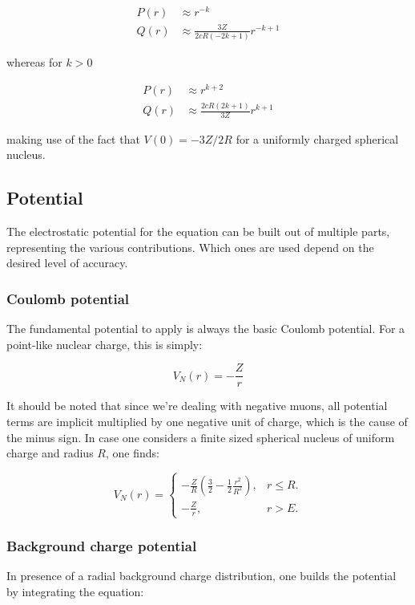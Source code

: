 \documentclass[]{report}
\begin{document}
\begin{align}
P(r) &\approx r^{-k} \\
Q(r) &\approx \frac{3Z}{2cR(-2k+1)}r^{-k+1}
\end{align}

whereas for $k > 0$

\begin{align}
P(r) &\approx r^{k+2} \\
Q(r) &\approx \frac{2cR(2k+1)}{3Z}r^{k+1}
\end{align}

making use of the fact that $V(0) = -3Z/2R$ for a uniformly charged spherical nucleus.

\subsection{Potential}\label{num_pot}

The electrostatic potential for the equation can be built out of multiple parts, representing the various contributions. Which ones are used depend on the desired level of accuracy.

\subsubsection{Coulomb potential}

The fundamental potential to apply is always the basic Coulomb potential. For a point-like nuclear charge, this is simply:

\begin{equation}
	V_N(r) = -\frac{Z}{r}
\end{equation}

It should be noted that since we're dealing with negative muons, all potential terms are implicit multiplied by one negative unit of charge, which is the cause of the minus sign. In case one considers a finite sized spherical nucleus of uniform charge and radius $R$, one finds:

\begin{equation}
V_N(r) = \begin{cases}
-\frac{Z}{R}\left(\frac{3}{2}-\frac{1}{2}\frac{r^2}{R^2}\right), & \text{$r\leq R$}.\\
-\frac{Z}{r}, & \text{$r > E$}.
\end{cases}
\end{equation}

\subsubsection{Background charge potential}
In presence of a radial background charge distribution, one builds the potential by integrating the equation:
\end{document}
